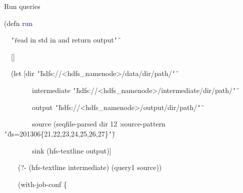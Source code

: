 \documentclass{beamer}
\renewcommand{\textquotedbl}{\texttt{\char`\"}}
\begin{document}
\begin{frame}{Run queries}
\begin{small}

{\ttfamily\color{black}
\textcolor[rgb]{0.54901963,0.54901963,0.54901963}{(}\textcolor[rgb]{0.49803922,0.0,0.49803922}{defn}
\textcolor{blue}{run}}

{\ttfamily\color{black}
\ \ \textcolor[rgb]{0.54509807,0.13333334,0.32156864}{{\textquotedbl}read
in std in and return output{\textquotedbl}}}

{\ttfamily\color{black}
\ \ []}

{\ttfamily\color{black}
\ \ \textcolor[rgb]{0.54901963,0.54901963,0.54901963}{(}\textcolor[rgb]{0.49803922,0.0,0.49803922}{let} 
[dir
\textcolor[rgb]{0.54509807,0.13333334,0.32156864}{{\textquotedbl}hdfs://<hdfs\_namenode>/data/dir/path/{\textquotedbl}}\textcolor[rgb]{0.69803923,0.13333334,0.13333334}{}}

{\ttfamily\color{black}
\ \ \ \ \ \ \ \ intermediate
\textcolor[rgb]{0.54509807,0.13333334,0.32156864}{{\textquotedbl}hdfs://<hdfs\_namenode>/intermediate/dir/path/{\textquotedbl}}}

{\ttfamily\color{black}
\ \ \ \ \ \ \ \ output
\textcolor[rgb]{0.54509807,0.13333334,0.32156864}{{\textquotedbl}hdfs://<hdfs\_namenode>/output/dir/path/{\textquotedbl}}}

{\ttfamily\color{black}
\ \ \ \ \ \ \ \ source
\textcolor[rgb]{0.54901963,0.54901963,0.54901963}{(}seqfile-parsed dir
12 \textcolor[rgb]{0.0,0.54509807,0.54509807}{:source-pattern}
\textcolor[rgb]{0.54509807,0.13333334,0.32156864}{{\textquotedbl}ds=201306\{21,22,23,24,25,26,27\}{\textquotedbl}}\textcolor[rgb]{0.54901963,0.54901963,0.54901963}{)}}


\bigskip

{\ttfamily\color{black}
\ \ \ \ \ \ \ \ sink
\textcolor[rgb]{0.54901963,0.54901963,0.54901963}{(}hfs-textline
output\textcolor[rgb]{0.54901963,0.54901963,0.54901963}{)}]}


{\ttfamily\color{black}
\ \ \ \ \textcolor[rgb]{0.54901963,0.54901963,0.54901963}{(}?-
\textcolor[rgb]{0.54901963,0.54901963,0.54901963}{(}hfs-textline
intermediate\textcolor[rgb]{0.54901963,0.54901963,0.54901963}{)}
\textcolor[rgb]{0.54901963,0.54901963,0.54901963}{(}query1
source\textcolor[rgb]{0.54901963,0.54901963,0.54901963}{))}}

{\ttfamily\color{black}
\ \ \ \ \textcolor[rgb]{0.54901963,0.54901963,0.54901963}{(}with-job-conf
\{\textcolor[rgb]{0.69803923,0.13333334,0.13333334}{}}


\end{small}
\end{frame}
\end{document}
